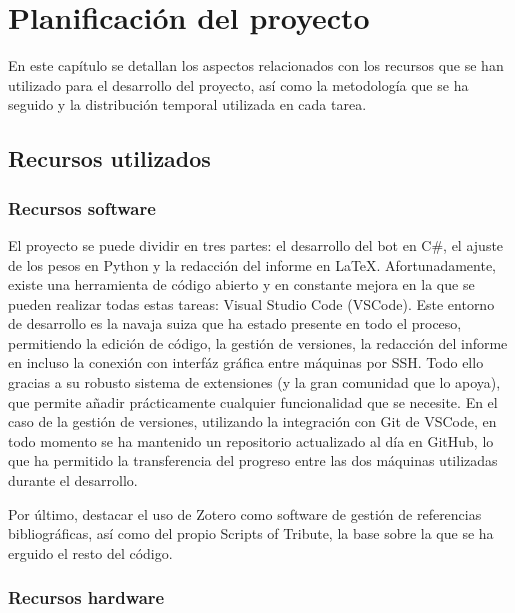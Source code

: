 \chapter{Planificación del proyecto} \label{chap:planificacion}

En este capítulo se detallan los aspectos relacionados con los recursos que se han utilizado para el desarrollo del proyecto, así como la metodología que se ha seguido y la distribución temporal utilizada en cada tarea.

\section{Recursos utilizados} \label{sec:recursos_utilizados}

\subsection{Recursos software} \label{sec:recursos_software}

El proyecto se puede dividir en tres partes: el desarrollo del bot en C\#, el ajuste de los pesos en Python y la redacción del informe en LaTeX. Afortunadamente, existe una herramienta de código abierto y en constante mejora en la que se pueden realizar todas estas tareas: Visual Studio Code (VSCode). Este entorno de desarrollo es la navaja suiza que ha estado presente en todo el proceso, permitiendo la edición de código, la gestión de versiones, la redacción del informe en incluso la conexión con interfáz gráfica entre máquinas por SSH. Todo ello gracias a su robusto sistema de extensiones (y la gran comunidad que lo apoya), que permite añadir prácticamente cualquier funcionalidad que se necesite. En el caso de la gestión de versiones, utilizando la integración con Git de VSCode, en todo momento se ha mantenido un repositorio actualizado al día en GitHub, lo que ha permitido la transferencia del progreso entre las dos máquinas utilizadas durante el desarrollo.

Por último, destacar el uso de Zotero como software de gestión de referencias bibliográficas, así como del propio Scripts of Tribute, la base sobre la que se ha erguido el resto del código.

\subsection{Recursos hardware} \label{sec:recursos_hardware}

